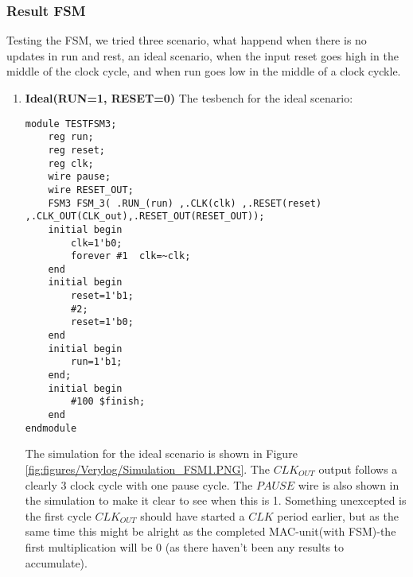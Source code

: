 \subsubsection{Result FSM}
Testing the FSM, we tried three scenario, what happend when there is no updates in run and rest, an ideal scenario, when the input reset goes high in the middle of the clock cycle, and when run goes low in the middle of a clock cyckle.

\begin{enumerate}
    \item \textbf{Ideal(RUN=1, RESET=0)}
    The tesbench for the ideal scenario:
    \begin{lstlisting}
module TESTFSM3;
	reg run;
	reg reset;
	reg clk;
	wire pause; 
	wire RESET_OUT;	
	FSM3 FSM_3( .RUN_(run) ,.CLK(clk) ,.RESET(reset) ,.CLK_OUT(CLK_out),.RESET_OUT(RESET_OUT));	
	initial begin
		clk=1'b0;
		forever #1	clk=~clk;
	end
	initial begin
		reset=1'b1;
		#2;
		reset=1'b0;	
	end	
	initial begin
		run=1'b1;	
	end;
	initial begin
		#100 $finish;
	end
endmodule
    \end{lstlisting}

    The simulation for the ideal scenario is shown in Figure \ref{fig:figures/Verylog/Simulation_FSM1.PNG}. The $CLK_{OUT}$ output follows a clearly 3 clock cycle with one pause cycle. The $PAUSE$ wire is also shown in the simulation to make it clear to see when this is 1. Something unexcepted is the first cycle $CLK_{OUT}$ should have started a $CLK$ period earlier, but as the same time this might be alright as the completed MAC-unit(with FSM)-the first multiplication will be 0 (as there haven’t been any results to accumulate).
    

\end{enumerate}
